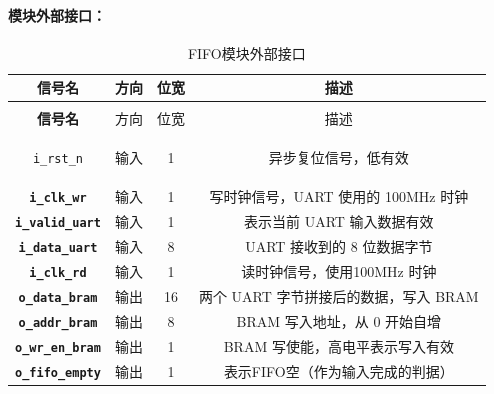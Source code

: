 \documentclass[lang=cn,a4paper,newtx]{elegantpaper}
\begin{document}
\paragraph{模块外部接口：}
\begin{longtable}{>{\bfseries}c c c c}
  \caption{FIFO模块外部接口} \\
  \toprule
  信号名 & 方向 & 位宽 & 描述 \\
  \midrule
  \endfirsthead

  \multicolumn{4}{l}{\textbf{（续表）FIFO模块外部接口}} \\
  \toprule
  信号名 & 方向 & 位宽 & 描述 \\
  \midrule
  \endhead

  \texttt{i\_rst\_n}         & 输入  & 1        & 异步复位信号，低有效 \\
  \texttt{i\_clk\_wr}        & 输入  & 1        & 写时钟信号，UART 使用的 100MHz 时钟 \\
  \texttt{i\_valid\_uart}    & 输入  & 1        & 表示当前 UART 输入数据有效 \\
  \texttt{i\_data\_uart}     & 输入  & 8        & UART 接收到的 8 位数据字节 \\
  \texttt{i\_clk\_rd}        & 输入  & 1        & 读时钟信号，使用100MHz 时钟 \\
  \texttt{o\_data\_bram}     & 输出  & 16       & 两个 UART 字节拼接后的数据，写入 BRAM \\
  \texttt{o\_addr\_bram}     & 输出  & 8        & BRAM 写入地址，从 0 开始自增 \\
  \texttt{o\_wr\_en\_bram}   & 输出  & 1        & BRAM 写使能，高电平表示写入有效 \\
  \texttt{o\_fifo\_empty}    & 输出   & 1       & 表示FIFO空（作为输入完成的判据）\\
  \bottomrule
\end{longtable}
\end{document}
